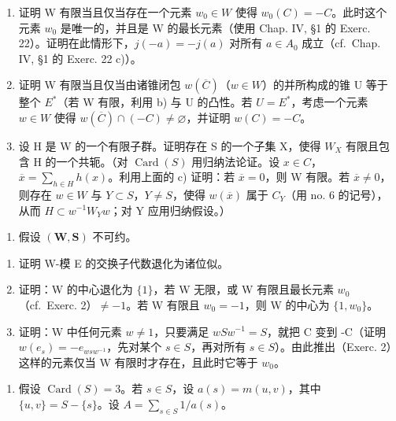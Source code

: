 \begin{enumerate}
\def\labelenumi{\alph{enumi})}
\setcounter{enumi}{1}
\item
  证明 W 有限当且仅当存在一个元素 \(w_{0} \in W\) 使得 \(w_{0}(C) = -C\)。此时这个元素 \(w_{0}\) 是唯一的，并且是 W 的最长元素（使用 Chap. IV, §1 的 Exerc. 22）。证明在此情形下，\(j(-a) = -j(a)\) 对所有 \(a \in A_{0}\) 成立（cf.~Chap. IV, §1 的 Exerc. 22 c)）。
\item
  证明 W 有限当且仅当由诸锥闭包 \(w(\overline{C})\)（\(w \in W\)）的并所构成的锥 U 等于整个 \(E^{*}\)（若 W 有限，利用 b) 与 U 的凸性。若 \(U = E^{*}\)，考虑一个元素 \(w \in W\) 使得 \(w(\overline{C}) \cap (-C) \neq \varnothing\)，并证明 \(w(C) = -C\)。
\item
  设 H 是 W 的一个有限子群。证明存在 S 的一个子集 X，使得 \(W_{X}\) 有限且包含 H 的一个共轭。（对 \(\operatorname{Card}(S)\) 用归纳法论证。设 \(x \in C\)，\(\overline{x} = \sum_{h \in H} h(x)\)。利用上面的 c) 证明：若 \(\overline{x} = 0\)，则 W 有限。若 \(\overline{x} \neq 0\)，则存在 \(w \in W\) 与 \(Y \subset S\)，\(Y \neq S\)，使得 \(w(\overline{x})\) 属于 \(C_{Y}\)（用 no. 6 的记号），从而 \(H \subset w^{-1}W_{Y}w\)；对 Y 应用归纳假设。）
\end{enumerate}

\begin{enumerate}
\def\labelenumi{\arabic{enumi})}
\setcounter{enumi}{2}
\tightlist
\item
  假设 \((\mathbf{W},\mathbf{S})\) 不可约。
\end{enumerate}

\begin{enumerate}
\def\labelenumi{\alph{enumi})}
\item
  证明 W-模 E 的交换子代数退化为诸位似。
\item
  证明：W 的中心退化为 \(\{1\}\)，若 W 无限，或 W 有限且最长元素 \(w_{0}\)（cf.~Exerc. 2）\(\neq -1\)。若 W 有限且 \(w_{0} = -1\)，则 W 的中心为 \(\{1, w_{0}\}\)。
\item
  证明：W 中任何元素 \(w \neq 1\)，只要满足 \(wSw^{-1} = S\)，就把 C 变到 -C（证明 \(w(e_s) = -e_{wsw^{-1}}\)，先对某个 \(s \in S\)，再对所有 \(s \in S\)）。由此推出（Exerc. 2）这样的元素仅当 W 有限时才存在，且此时它等于 \(w_0\)。
\end{enumerate}

\begin{enumerate}
\def\labelenumi{\arabic{enumi})}
\setcounter{enumi}{3}
\tightlist
\item
  假设 \(\operatorname{Card}(S) = 3\)。若 \(s \in S\)，设 \(a(s) = m(u, v)\)，其中 \(\{u, v\} = S - \{s\}\)。设 \(A = \sum_{s \in S} 1 / a(s)\)。
\end{enumerate}

